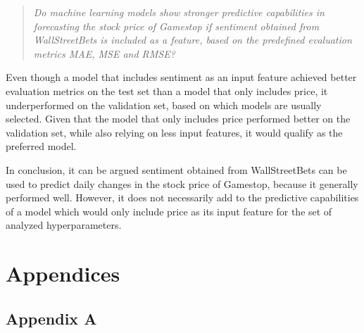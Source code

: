 \documentclass[11pt, a4paper]{article}
\begin{document}
\begin{quote}
    \emph{Do machine learning models show stronger predictive capabilities in forecasting the stock price of Gamestop if sentiment obtained from WallStreetBets is included as a feature, based on the predefined evaluation metrics MAE, MSE and RMSE?}
\end{quote}

Even though a model that includes sentiment as an input feature achieved better evaluation metrics on the test set than a model that only includes price,
it underperformed on the validation set, based on which models are usually selected.
Given that the model that only includes price performed better on the validation set, while also relying on less input features, it
would qualify as the preferred model.

In conclusion, it can be argued sentiment obtained from WallStreetBets can be used to predict daily changes in the stock price
of Gamestop, because it generally performed well. However, it
does not necessarily add to the predictive capabilities of a model which would only include price as its input feature for the set
of analyzed hyperparameters.


\pagebreak
\section{Appendices}

\subsection{Appendix A}
\label{appendix:A}
\end{document}
